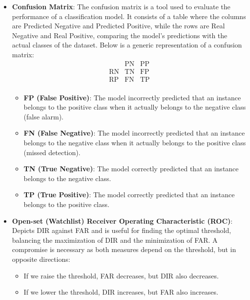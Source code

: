 \begin{itemize}
    \item \textbf{Confusion Matrix}:  
    The confusion matrix is a tool used to evaluate the performance of a classification model. It consists of a table where the columns are Predicted Negative and Predicted Positive, while the rows are Real Negative and Real Positive, comparing the model's predictions with the actual classes of the dataset. Below is a generic representation of a confusion matrix:
    \[
    \begin{array}{c|c|c}
          & \text{PN} & \text{PP} \\ \hline
        \text{RN} & \text{TN} & \text{FP} \\ 
        \text{RP} & \text{FN} & \text{TP} \\
    \end{array}
    \]
  
    \begin{itemize}
        \item \textbf{FP (False Positive)}:  
        The model incorrectly predicted that an instance belongs to the positive class when it actually belongs to the negative class (false alarm).
        
        \item \textbf{FN (False Negative)}:  
        The model incorrectly predicted that an instance belongs to the negative class when it actually belongs to the positive class (missed detection).
        
        \item \textbf{TN (True Negative)}:  
        The model correctly predicted that an instance belongs to the negative class.
        
        \item \textbf{TP (True Positive)}:  
        The model correctly predicted that an instance belongs to the positive class.
    \end{itemize}

    \item \textbf{Open-set (Watchlist) Receiver Operating Characteristic (ROC)}: Depicts DIR against FAR and is useful for finding the optimal threshold, balancing the maximization of DIR and the minimization of FAR. A compromise is necessary as both measures depend on the threshold, but in opposite directions:
    \begin{itemize}
        \item If we raise the threshold, FAR decreases, but DIR also decreases.
        \item If we lower the threshold, DIR increases, but FAR also increases.
    \end{itemize}

\end{itemize}

